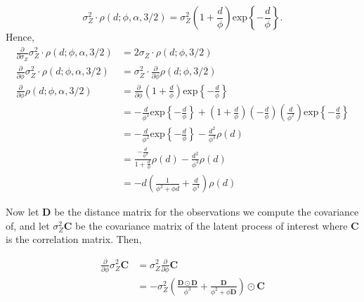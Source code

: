 {$$ \sigma_Z^2 \cdot \rho(d; \phi, \alpha , 3/2) = \sigma_Z^2 \left( 1 + \frac{d}{\phi} \right) \text{exp} \left\{ -\frac{d}{\phi} \right \}. $$
Hence,
\begin{align*}
\frac{\partial}{\partial \sigma_Z} \sigma_Z^2 \cdot \rho(d; \phi, \alpha , 3/2) &= 2\sigma_Z \cdot \rho(d;\phi, 3/2) \\
\frac{\partial}{\partial \phi} \sigma_Z^2 \cdot \rho(d; \phi, \alpha , 3/2) &= \sigma_Z^2 \cdot \frac{\partial}{\partial \phi} \rho(d; \phi, 3/2) \\
\frac{\partial}{\partial \phi} \rho(d; \phi, \alpha , 3/2) &= \frac{\partial}{\partial \phi} \left( 1 + \frac{d}{\phi} \right) \text{exp} \left\{ -\frac{d}{\phi} \right \} \\
&= -\frac{d}{\phi^2} \text{exp} \left \{ -\frac{d}{\phi} \right \} + \left( 1 + \frac{d}{\phi} \right) \left(-\frac{d}{\phi} \right) \left( \frac{d}{\phi^2} \right) \text{exp} \left \{ -\frac{d}{\phi} \right \} \\
&= -\frac{d}{\phi^2} \text{exp} \left \{ -\frac{d}{\phi} \right \} - \frac{d^2}{\phi^3} \rho(d) \\
&= \frac{-\frac{d}{\phi^2}}{1 + \frac{d}{\phi}} \rho(d) - \frac{d^2}{\phi^3} \rho(d) \\
&= - d \left(\frac{1}{\phi^2 + \phi d} + \frac{d}{\phi^3} \right) \rho(d) 
\end{align*}

Now let $\mathbf{D}$ be the distance matrix for the observations we compute the covariance of, and let $\sigma_Z^2 \mathbf{C}$ be the covariance matrix of the latent process of interest where $\mathbf{C}$ is the correlation matrix.  Then, 

\begin{align*}
\frac{\partial}{\partial \phi} \sigma_Z^2 \mathbf{C} &= \sigma_Z^2 \frac{\partial}{\partial \phi} \mathbf{C} \\
&= -\sigma_Z^2 \left( \frac{\mathbf{D} \odot \mathbf{D}}{\phi^3} + \frac{\mathbf{D}}{\phi^2 + \phi \mathbf{D}} \right) \odot \mathbf{C}
\end{align*}

}
